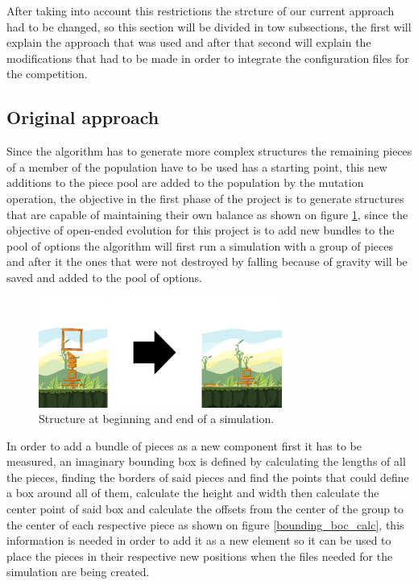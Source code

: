 \documentclass[conference]{IEEEtran}
\begin{document}
After taking into account this restrictions the strcture of our current approach had to be changed, so this section will be divided in tow subsections, the first will explain the approach that was used and after that second will explain the modifications that had to be made in order to integrate the configuration files for the competition. 

\subsection{Original approach}

Since the algorithm has to generate more complex structures the remaining pieces of a member of the population have to be used has a starting point, this new additions to the piece pool are added to the population by the mutation operation, the objective in the first phase of the project is to generate structures that are capable of maintaining their own balance as shown on figure \ref{test_old}, since the objective of open-ended evolution for this project is to add new bundles to the pool of options the algorithm will first run a simulation with a group of pieces and after it the ones that were not destroyed by falling because of gravity will be saved and added to the pool of options.

\begin{figure}[htbp]
\centerline{\includegraphics[width=80mm]{Images/simulation_bef_aft_example.png}}
\caption{Structure at beginning and end of a simulation.}
\label{test_old}
\end{figure}

In order to add a bundle of pieces as a new component first it has to be measured, an imaginary bounding box is defined by calculating the lengths of all the pieces, finding the borders of said pieces and find the points that could define a box around all of them, calculate the height and width then calculate the center point of said box and calculate the offsets from the center of the group to the center of each respective piece as shown on figure \ref{bounding_boc_calc}, this information is needed in order to add it as a new element so it can be used to place the pieces in their respective new positions when the files needed for the simulation are being created.
\end{document}
